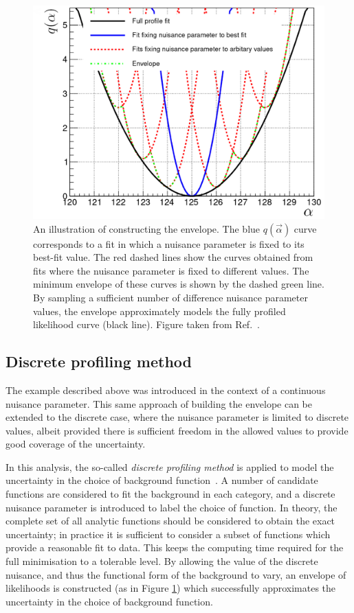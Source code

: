 \begin{figure}[hptb]
  \centering
  \includegraphics[width=.6\textwidth]{Figures/hgg_stats/nuisance_illustration.pdf}
  \caption[Constructing the envelope]
  {
    An illustration of constructing the envelope. The blue $q(\vec{\alpha})$ curve corresponds to a fit in which a nuisance parameter is fixed to its best-fit value. The red dashed lines show the curves obtained from fits where the nuisance parameter is fixed to different values. The minimum envelope of these curves is shown by the dashed green line. By sampling a sufficient number of difference nuisance parameter values, the envelope approximately models the fully profiled likelihood curve (black line). Figure taken from Ref.~\cite{Dauncey:2014xga}.
  }
  \label{fig:nuisance_illustration}
\end{figure}

\subsection{Discrete profiling method}
The example described above was introduced in the context of a continuous nuisance parameter. This same approach of building the envelope can be extended to the discrete case, where the nuisance parameter is limited to discrete values, albeit provided there is sufficient freedom in the allowed values to provide good coverage of the uncertainty.

In this analysis, the so-called \textit{discrete profiling method} is applied to model the uncertainty in the choice of background function~\cite{Dauncey:2014xga}. A number of candidate functions are considered to fit the background in each category, and a discrete nuisance parameter is introduced to label the choice of function. In theory, the complete set of all analytic functions should be considered to obtain the exact uncertainty; in practice it is sufficient to consider a subset of functions which provide a reasonable fit to data. This keeps the computing time required for the full minimisation to a tolerable level. By allowing the value of the discrete nuisance, and thus the functional form of the background to vary, an envelope of likelihoods is constructed (as in Figure \ref{fig:nuisance_illustration}) which successfully approximates the uncertainty in the choice of background function.

